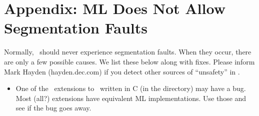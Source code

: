 %
%
%
\section{Appendix: ML Does Not Allow Segmentation Faults}

Normally, \ensemble\ should never experience segmentation faults.  When they occur,
there are only a few possible causes.  We list these below along with fixes.  Please
inform Mark Hayden (hayden\@pa.dec.com) if you detect other sources of
``unsafety'' in \ensemble.
\begin{itemize}
\item
One of the \ensemble\ extensions to \caml\ written in C (in the
 directory) may have a bug.  Most (all?) extensions have
equivalent ML implementations.  Use those and see if the bug goes away.
\end{itemize}


